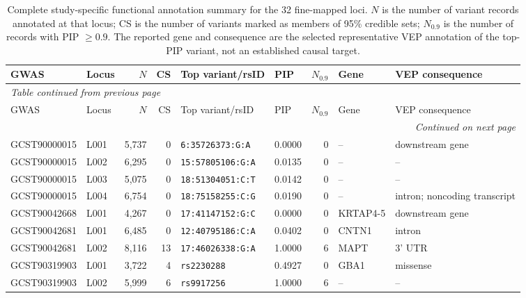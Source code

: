 \documentclass[11pt,a4paper]{article}
\begin{document}
\begin{landscape}
\begingroup
\scriptsize
\setlength{\tabcolsep}{3.7pt}
\renewcommand{\arraystretch}{1.10}
\begin{longtable}{@{}llrrllrlp{4.0cm}@{}}
\caption{Complete study-specific functional annotation summary
for the 32 fine-mapped loci. $N$ is the number of variant
records annotated at that locus; CS is the number of variants
marked as members of 95\% credible sets; $N_{0.9}$ is the
number of records with PIP $\geq0.9$. The reported gene and
consequence are the selected representative VEP annotation
of the top-PIP variant, not an established causal target.}
\label{tab:step08_locus_master}\\
\toprule
GWAS & Locus & $N$ & CS & Top variant/rsID & PIP & $N_{0.9}$ & Gene & VEP consequence \\
\midrule
\endfirsthead
\multicolumn{9}{l}{\textit{Table continued from previous page}}\\
\toprule
GWAS & Locus & $N$ & CS & Top variant/rsID & PIP & $N_{0.9}$ & Gene & VEP consequence \\
\midrule
\endhead
\midrule\multicolumn{9}{r}{\textit{Continued on next page}}\\
\endfoot
\bottomrule
\endlastfoot
GCST90000015 & L001 & 5,737 & 0 & \texttt{6:35726373:G:A} & 0.0000 & 0 & -- & downstream gene \\
GCST90000015 & L002 & 6,295 & 0 & \texttt{15:57805106:G:A} & 0.0135 & 0 & -- & -- \\
GCST90000015 & L003 & 5,075 & 0 & \texttt{18:51304051:C:T} & 0.0142 & 0 & -- & -- \\
GCST90000015 & L004 & 6,754 & 0 & \texttt{18:75158255:C:G} & 0.0190 & 0 & -- & intron; noncoding transcript \\
GCST90042668 & L001 & 4,267 & 0 & \texttt{17:41147152:G:C} & 0.0000 & 0 & KRTAP4-5 & downstream gene \\
GCST90042681 & L001 & 6,485 & 0 & \texttt{12:40795186:C:A} & 0.0402 & 0 & CNTN1 & intron \\
GCST90042681 & L002 & 8,116 & 13 & \texttt{17:46026338:G:A} & 1.0000 & 6 & MAPT & 3' UTR \\
GCST90319903 & L001 & 3,722 & 4 & \texttt{rs2230288} & 0.4927 & 0 & GBA1 & missense \\
GCST90319903 & L002 & 5,999 & 6 & \texttt{rs9917256} & 1.0000 & 6 & -- & -- \\

\end{longtable}
\end{landscape}
\end{document}
